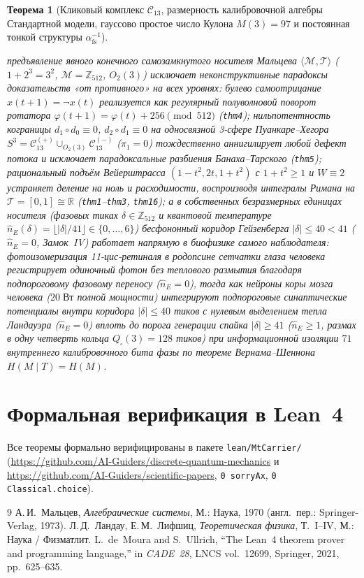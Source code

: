 \documentclass[11pt,a4paper]{article}
\theoremstyle{plain}
\newtheorem{theorem}{Теорема}[section]
\theoremstyle{definition}
\begin{document}
\begin{theorem}[Кликовый комплекс $\mathcal{C}_{13}$, размерность калибровочной алгебры Стандартной модели, гауссово простое число Кулона $\hat{M}(3)=97$ и постоянная тонкой структуры $\alpha_{\mathrm{fs}}^{-1}$]
\begin{enumerate}[label=\textbf{(\roman*)},leftmargin=*]
  предъявление явного конечного самозамкнутого носителя Мальцева $\langle\mathcal{M},\mathcal{T}\rangle$ ($1+2^3=3^2$, $\mathcal{M}=\mathbb{Z}_{512}$, $O_2(3)$) исключает неконструктивные парадоксы доказательств «от противного» на всех уровнях: булево самоотрицание $x(t+1)=\neg x(t)$ реализуется как регулярный полуволновой поворот ротатора $\varphi(t+1)=\varphi(t)+256\pmod{512}$ (\texttt{thm4}); нильпотентность кограницы $d_1\circ d_0\equiv 0$, $d_2\circ d_1\equiv 0$ на односвязной 3-сфере Пуанкаре--Хегора $S^3 = \mathcal{C}_{13}^{(+)}\cup_{O_2(3)}\mathcal{C}_{13}^{(-)}$ ($\pi_1=0$) тождественно аннигилирует любой дефект потока и исключает парадоксальные разбиения Банаха--Тарского (\texttt{thm5}); рациональный подъём Вейерштрасса $(1-t^2,2t,1+t^2)$ с $1+t^2\ge 1$ и $W\equiv 2$ устраняет деление на ноль и расходимости, воспроизводя интегралы Римана на $\mathcal{T}=[0,1]\cong\mathbb{R}$ (\texttt{thm1}--\texttt{thm3}, \texttt{thm16}); а в собственных безразмерных единицах носителя (фазовых тиках $\delta\in\mathbb{Z}_{512}$ и квантовой температуре $\hat{n}_E(\delta) = \lfloor|\delta|/41\rfloor\in\{0,\dots,6\}$) бесфононный коридор Гейзенберга $|\delta|\le 40 < 41$ ($\hat{n}_E=0$, Замок~IV) работает напрямую в биофизике самого наблюдателя: фотоизомеризация 11-\emph{цис}-ретиналя в родопсине сетчатки глаза человека регистрирует одиночный фотон без теплового размытия благодаря подпороговому фазовому переносу ($\hat{n}_E=0$), тогда как нейроны коры мозга человека ($20\;\text{Вт}$ полной мощности) интегрируют подпороговые синаптические потенциалы внутри коридора $|\delta|\le 40$ тиков с нулевым выделением тепла Ландауэра ($\hat{n}_E=0$) вплоть до порога генерации спайка $|\delta|\ge 41$ ($\hat{n}_E\ge 1$, размах в одну четверть кольца $Q_\square(3)=128$ тиков) при информационной изоляции $71$ внутреннего калибровочного бита фазы по теореме Вернама--Шеннона $H(M\mid T)=H(M)$.
\end{enumerate}
\end{theorem}

\section{Формальная верификация в Lean~4}
Все теоремы формально верифицированы в пакете \texttt{lean/MtCarrier/} (\url{https://github.com/AI-Guiders/discrete-quantum-mechanics} и \url{https://github.com/AI-Guiders/scientific-papers}, \texttt{0 sorryAx}, \texttt{0 Classical.choice}).

\begin{thebibliography}{9}
А.\,И.~Мальцев, \emph{Алгебраические системы}, М.: Наука, 1970 (англ.\ пер.: Springer-Verlag, 1973).
Л.\,Д.~Ландау, Е.\,М.~Лифшиц, \emph{Теоретическая физика}, Т.~I--IV, М.: Наука / Физматлит.
L.~de~Moura and S.~Ullrich, ``The Lean~4 theorem prover and programming language,'' in \emph{CADE~28}, LNCS vol.~12699, Springer, 2021, pp.~625--635.
\end{thebibliography}
\end{document}

